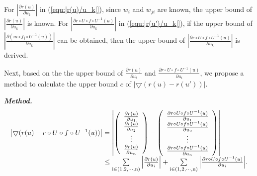 For $\left| {\frac{{\partial r(u)}}{{\partial {u_k}}}} \right|$ in (\ref{equ:|r(u)/u_k|}), since $w_i$ and $w_{ji}$ are known, the upper bound of $\left| {\frac{{\partial r(u)}}{{\partial {u_k}}}} \right|$ is known. For $\left| {\frac{{\partial r \circ U \circ f \circ {U^{ - 1}}(u)}}{{\partial {u_k}}}} \right|$ in (\ref{equ:|r(u')/u_k|}), if the upper bound of ${\left| {\frac{{\partial (m \circ {f_j} \circ {U^{ - 1}}(u))}}{{\partial {u_k}}}} \right|}$ can be obtained, then the upper bound of $\left| {\frac{{\partial r \circ U \circ f \circ {U^{ - 1}}(u)}}{{\partial {u_k}}}} \right|$ is derived.

Next, based on the the upper bound of $\frac{{\partial r(u)}}{{\partial {u_i}}}$ and $\frac{{\partial r \circ U \circ f \circ {U^{ - 1}}(u)}}{{\partial {u_i}}}$, we propose a method to calculate the upper bound $c$ of $\left| \bigtriangledown{(r(u) - r(u'))} \right|$.

\textbf{\emph{Method.}}
\begin{equation}\label{equ:method(u)}
\begin{array}{l}
\left| {\bigtriangledown(r(u) - r \circ U \circ f \circ {U^{ - 1}}(u))} \right| = \left| {\left( \begin{array}{c}
	\frac{{\partial r(u)}}{{\partial {u_1}}}\\
	\frac{{\partial r(u)}}{{\partial {u_2}}}\\
	\vdots \\
	\frac{{\partial r(u)}}{{\partial {u_n}}}
	\end{array} \right) - \left( \begin{array}{c}
	\frac{{\partial r \circ U \circ f \circ {U^{ - 1}}(u)}}{{\partial {u_1}}}\\
	\frac{{\partial r \circ U \circ f \circ {U^{ - 1}}(u)}}{{\partial {u_2}}}\\
	\vdots \\
	\frac{{\partial r \circ U \circ f \circ {U^{ - 1}}(u)}}{{\partial {u_n}}}
	\end{array} \right)} \right|\;\\
\quad \quad \quad \quad \quad \quad \quad \quad \quad \,\quad \quad \quad\quad\,\; \le \sum\limits_{{\rm{i}} \in {\rm{(1,2,}} \cdots {\rm{,n)}}} {\left| {\frac{{\partial r(u)}}{{\partial {u_i}}}} \right|}  + \sum\limits_{{\rm{i}} \in {\rm{(1,2,}} \cdots {\rm{,n)}}} {\left| {\frac{{\partial r \circ U \circ f \circ {U^{ - 1}}(u)}}{{\partial {u_i}}}} \right|}. 
\end{array}
\end{equation}

